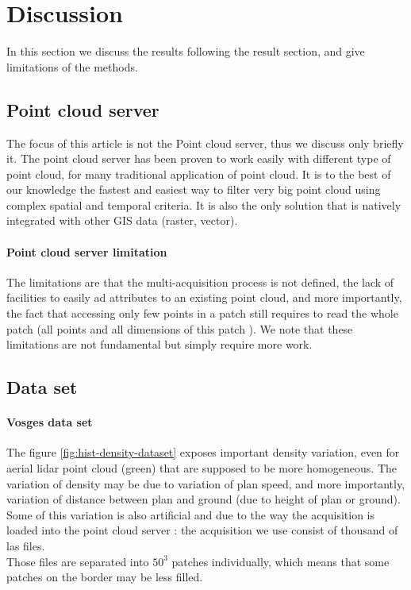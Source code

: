 

 \section{ Discussion }
	 \label{sec:discussion}
	 In this section we discuss the results following the result section, and give limitations of the methods.
	 
	 \subsection{Point cloud server}
		The focus of this article is not the Point cloud server, thus we discuss only briefly it.
		The point cloud server has been proven to work easily with different type of point cloud, for many traditional application of point cloud. It is to the best of our knowledge the fastest and easiest way to filter very big point cloud using complex spatial and temporal criteria.
		It is also the only solution that is natively integrated with other GIS data (raster, vector).
		\paragraph{Point cloud server limitation}
		\label{par:pointcloudserver-limitation}
		The limitations are that the multi-acquisition process is not defined, the lack of facilities to easily ad attributes to an existing point cloud, and more importantly, the fact that accessing only few points in a patch still requires to read the whole patch (all points and all dimensions of this patch ).
		We note that these limitations are not fundamental but simply require more work. 
		
	 \subsection{Data set}
		 \paragraph{Vosges data set}
			 The figure \ref{fig:hist-density-dataset} exposes important density variation, even for aerial lidar point cloud (green) that are supposed to be more homogeneous. The variation of density may be due to variation of plan speed, and more importantly, variation of distance between plan and ground (due to height of plan or ground). 
			 \\
			 Some of this variation is also artificial and due to the way the acquisition is loaded into the point cloud server : the acquisition we use consist of thousand of las files.\\
			 Those files are separated into $50^3$ \cubic \meter\space patches individually, which means that some patches on the border may be less filled.
